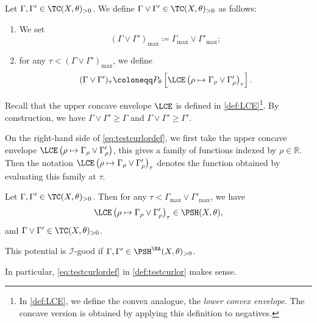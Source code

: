 \begin{definition}\label{def:testcurlor}
    Let $\Gamma,\Gamma'\in \TC(X,\theta)_{>0}$. We define $\Gamma\lor \Gamma'\in \TC(X,\theta)_{>0}$ as follows:
    \begin{enumerate}
        \item\label{itm:def:testcurlor:1} We set
        \[
            (\Gamma\lor \Gamma')_{\max}\coloneqq \Gamma_{\max}\lor \Gamma'_{\max};
        \]
        \item\label{itm:def:testcurlor:2} for any $\tau<(\Gamma\lor \Gamma')_{\max}$, we define
        \begin{equation}\label{eq:testcurlordef}
            (\Gamma\lor \Gamma')_{\tau}\coloneqq P_{\theta}\left[ \LCE\left( \rho \mapsto \Gamma_{\rho}\lor \Gamma'_{\rho} \right)_{\tau} \right].
        \end{equation}
    \end{enumerate}
\end{definition}
Recall that the upper concave envelope $\LCE$ is defined in \cref{def:LCE}\footnote{In \cref{def:LCE}, we define the convex analogue, the \emph{lower convex envelope}. The concave version is obtained by applying this definition to negatives.}. By construction, we have $\Gamma\lor \Gamma'\geq \Gamma$ and $\Gamma\lor \Gamma'\geq \Gamma'$.

On the right-hand side of \eqref{eq:testcurlordef}, we first take the upper concave envelope $\LCE\left( \rho \mapsto \Gamma_{\rho}\lor \Gamma'_{\rho} \right)$, this gives a family of functions indexed by $\rho\in \mathbb{R}$. Then the notation $\LCE\left( \rho \mapsto \Gamma_{\rho}\lor \Gamma'_{\rho} \right)_{\tau}$ denotes the function obtained by evaluating this family at $\tau$.

\begin{lemma}\label{lma:testcurlor}
    Let $\Gamma,\Gamma'\in \TC(X,\theta)_{>0}$. Then for any $\tau<\Gamma_{\max}\lor \Gamma'_{\max}$, we have
    \[
        \LCE\left( \rho \mapsto \Gamma_{\rho}\lor \Gamma'_{\rho} \right)_{\tau}\in \PSH(X,\theta),
    \]
    and $\Gamma\lor \Gamma'\in \TC(X,\theta)_{>0}$.

    This potential is $\mathcal{I}$-good if $\Gamma,\Gamma'\in \PSH^{\NA}(X,\theta)_{>0}$.

    In particular, \eqref{eq:testcurlordef} in \cref{def:testcurlor} makes sense.
\end{lemma}

